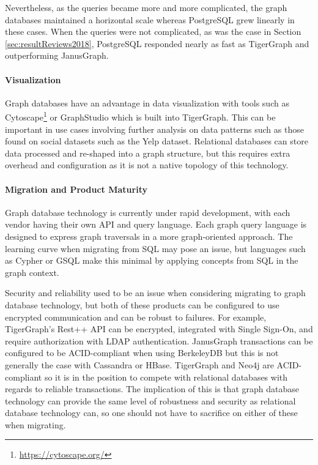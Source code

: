 Nevertheless, as the queries became more and more complicated, the graph databases maintained a horizontal scale whereas PostgreSQL grew linearly in these cases. When the queries were not complicated, as was the case in Section \ref{sec:resultReviews2018}, PostgreSQL responded nearly as fast as TigerGraph and outperforming JanusGraph. 

\paragraph{Visualization}

Graph databases have an advantage in data visualization with tools such as Cytoscape\footnote{\url{https://cytoscape.org/}} or GraphStudio which is built into TigerGraph. This can be important in use cases involving further analysis on data patterns such as those found on social datasets such as the Yelp dataset. Relational databases can store data processed and re-shaped into a graph structure, but this requires extra overhead and configuration as it is not a native topology of this technology.

\paragraph{Migration and Product Maturity}

Graph database technology is currently under rapid development, with each vendor having their own API and query language. Each graph query language is designed to express graph traversals in a more graph-oriented approach. The learning curve when migrating from SQL may pose an issue, but languages such as Cypher or GSQL make this minimal by applying concepts from SQL in the graph context.

Security and reliability used to be an issue when considering migrating to graph database technology, but both of these products can be configured to use encrypted communication and can be robust to failures. For example, TigerGraph's Rest++ API can be encrypted, integrated with Single Sign-On, and require authorization with LDAP authentication. JanusGraph transactions can be configured to be ACID-compliant when using BerkeleyDB but this is not generally the case with Cassandra or HBase. TigerGraph and Neo4j are ACID-compliant so it is in the position to compete with relational databases with regards to reliable transactions. The implication of this is that graph database technology can provide the same level of robustness and security as relational database technology can, so one should not have to sacrifice on either of these when migrating.

